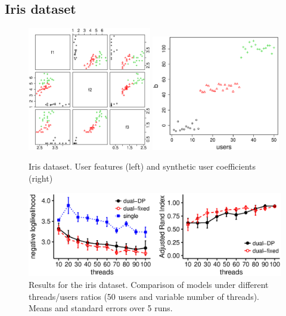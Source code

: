 \documentclass[smallextended]{svjour3}          %
\begin{document}
\subsection{Iris dataset}
\begin{figure}
	\centering
	\includegraphics[width=0.48\textwidth]{Fig7_data_iris_features_bw}%
	\includegraphics[width=0.5\textwidth]{Fig7_data_iris_behaviors_bw}
	\caption{Iris dataset. User features (left) and synthetic user coefficients (right)}
	\label{fig:iris_data}
\end{figure}
\begin{figure}
	\centering
	\includegraphics[width=1\textwidth]{Fig8_results_iris_bw}
	\caption{Results for the iris dataset. Comparison of models under different threads/users ratios (50 users and variable number of threads). Means and standard errors over 5 runs.}
	\label{fig:iris_results}
\end{figure}
\end{document}
